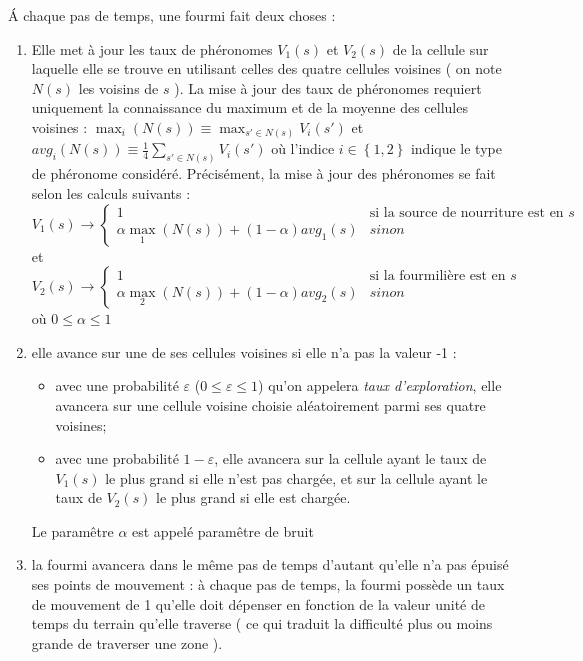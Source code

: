 \documentclass[a4]{article}
\begin{document}
\'A chaque pas de temps, une fourmi fait deux choses :
\begin{enumerate}
\item Elle met à jour les taux de phéronomes $V_{1}(s)$ et $V_{2}(s)$ de la cellule sur laquelle elle se trouve en utilisant celles des quatre cellules voisines ( on note $N(s)$ les voisins de $s$ ). La mise à jour des taux de phéronomes requiert uniquement la connaissance du maximum et de la moyenne des cellules voisines : $\max_{i}\left(N(s)\right) \equiv \max_{s'\in N(s)}V_{i}(s')$ et $avg_{i}\left(N(s)\right)\equiv\frac{1}{4} \sum_{s'\in N(s)} V_{i}(s')$ où l'indice $i\in\left\{1,2\right\}$ indique le type de phéronome considéré.  Précisément, la mise à jour des phéronomes se fait selon les calculs suivants :
\[
V_{1}(s) \rightarrow \left\{\begin{array}{ll} 
 1 & \mbox{si la source de nourriture est en }s \\
 \alpha \max_{1}(N(s)) + (1-\alpha)avg_{1}(s) & sinon
 \end{array}\right.
 \]
 et
\[
V_{2}(s) \rightarrow \left\{\begin{array}{ll} 
 1 & \mbox{si la fourmilière est en }s \\
 \alpha \max_{2}(N(s)) + (1-\alpha)avg_{2}(s) & sinon
 \end{array}\right.
 \]
où $0\leq \alpha \leq 1$ 
\item elle avance sur une de ses cellules voisines si elle n'a pas la valeur -1 :
\begin{itemize}
\item avec une probabilité $\varepsilon$ ($0 \leq \varepsilon \leq 1$) qu'on appelera \textsl{taux d'exploration}, elle avancera sur une cellule voisine choisie aléatoirement parmi ses quatre voisines;
\item avec une probabilité $1-\varepsilon$, elle avancera sur la cellule ayant le taux de $V_{1}(s)$ le plus grand si elle n'est pas
chargée, et sur la cellule ayant le taux de $V_{2}(s)$ le plus grand si elle est chargée.
\end{itemize}
Le paramêtre $\alpha$ est appelé paramêtre de bruit
\item la fourmi avancera dans le même pas de temps d'autant qu'elle n'a pas épuisé ses points de mouvement : à chaque pas de temps, la
fourmi possède un taux de mouvement de 1 qu'elle doit dépenser en fonction de la valeur unité de temps du terrain qu'elle traverse ( ce
qui traduit la difficulté plus ou moins grande de traverser une zone ). 
\end{enumerate}
\end{document}
